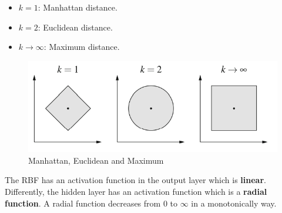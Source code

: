 \documentclass{article}
\begin{document}
\begin{itemize}
    \item $k=1$: Manhattan distance.
    \item $k=2$: Euclidean distance.
    \item $k\rightarrow\infty$: Maximum distance.
\end{itemize}
\begin{figure}[H]
    \centering
    \includegraphics[scale=0.5]{images/mknowski.png}
    \caption{Manhattan, Euclidean and Maximum}
\end{figure}
The RBF has an activation function in the output layer which is \textbf{linear}. Differently, the
hidden layer has an activation function which is a \textbf{radial function}. A radial function
decreases from $0$ to $\infty$ in a monotonically way.
\end{document}
